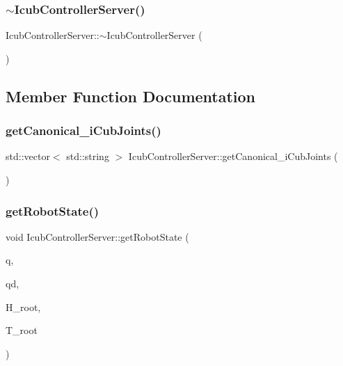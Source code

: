 \subsubsection{\texorpdfstring{$\sim$\+Icub\+Controller\+Server()}{~IcubControllerServer()}}
{\footnotesize\ttfamily Icub\+Controller\+Server\+::$\sim$\+Icub\+Controller\+Server (\begin{DoxyParamCaption}{ }\end{DoxyParamCaption})\hspace{0.3cm}{\ttfamily [virtual]}}



\subsection{Member Function Documentation}
\hypertarget{classIcubControllerServer_a892bb43e568d3f112465dff1e0c6b348}{}\label{classIcubControllerServer_a892bb43e568d3f112465dff1e0c6b348} 
\subsubsection{\texorpdfstring{get\+Canonical\+\_\+i\+Cub\+Joints()}{getCanonical\_iCubJoints()}}
{\footnotesize\ttfamily std\+::vector$<$ std\+::string $>$ Icub\+Controller\+Server\+::get\+Canonical\+\_\+i\+Cub\+Joints (\begin{DoxyParamCaption}{ }\end{DoxyParamCaption})}

\hypertarget{classIcubControllerServer_ac068c7930f342bb0cb0969d0d04267cf}{}\label{classIcubControllerServer_ac068c7930f342bb0cb0969d0d04267cf} 
\subsubsection{\texorpdfstring{get\+Robot\+State()}{getRobotState()}}
{\footnotesize\ttfamily void Icub\+Controller\+Server\+::get\+Robot\+State (\begin{DoxyParamCaption}\item[{Eigen\+::\+Vector\+Xd \&}]{q,  }\item[{Eigen\+::\+Vector\+Xd \&}]{qd,  }\item[{Eigen\+::\+Displacementd \&}]{H\+\_\+root,  }\item[{Eigen\+::\+Twistd \&}]{T\+\_\+root }\end{DoxyParamCaption})\hspace{0.3cm}{\ttfamily [virtual]}}

